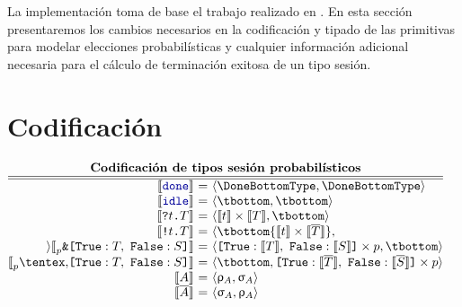 La implementación toma de base el trabajo realizado en \FuSe. En esta sección
presentaremos los cambios necesarios en la codificación y tipado de las
primitivas para modelar elecciones probabilísticas y cualquier información
adicional necesaria para el cálculo de terminación exitosa de un tipo sesión.

\section{Codificación}

\begin{center}
$\displaystyle
  \begin{array}{@{}c@{}}
    \textbf{Codificación de tipos sesión probabilísticos} \\
    \hline
    \hline
    \begin{array}[t]{@{}r@{~}c@{~}l@{}}
      \encfun\Done
      & = &
      \tsession\DoneBottomType\DoneBottomType
      \\
      \encfun\Idle
      & = &
      \tsession\tbottom\tbottom
      \\
      \encfun{\In\Type\SessionType}
      & = &
      \tsession{\encfun\Type\tmul\encfun\SessionType}\tbottom
      \\
      \encfun{\Out\Type\SessionType}
      & = &
      \tsession\tbottom{\encfun\Type\tmul\encfun{\dual\SessionType}}
      \\
      \encfun{\BinaryPBranch[p]{\SessionTypeT}{\SessionTypeS}}
      & = &
      \tsession{\BinaryLabels{\encfun{\SessionTypeT}}{\encfun{\SessionTypeS}}\tmul p}\tbottom
      \\
      \encfun{\BinaryPChoice[p]{\SessionTypeT}{\SessionTypeS}}
      & = &
      \tsession{\tbottom}{\BinaryLabels{\encfun{\dual\SessionTypeT}}{\encfun{\dual\SessionTypeS}}\tmul p}
      \\
      \encfun\etvar
      & = &
      \tsession{\renc\etvar}{\senc\etvar}
      \\
      \encfun{\sdual\etvar}
      & = &
      \tsession{\senc\etvar}{\renc\etvar}
    \end{array}
  \end{array}
$
\end{center}
